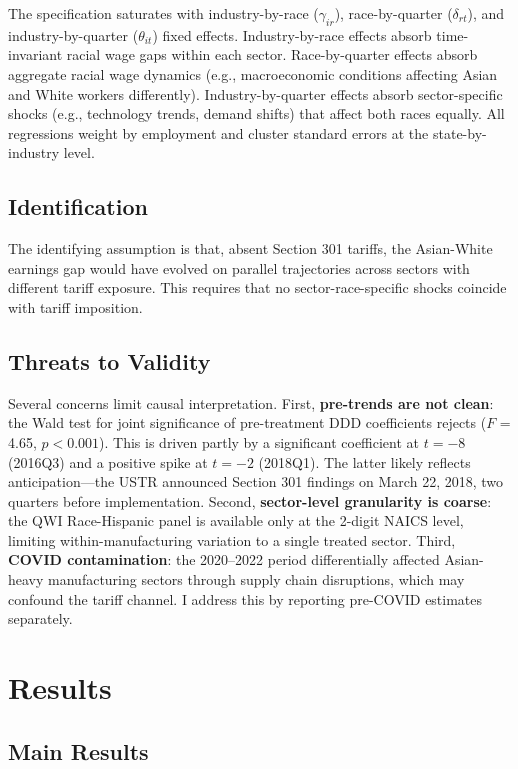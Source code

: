 \documentclass[12pt]{article}
\begin{document}
The specification saturates with industry-by-race ($\gamma_{ir}$), race-by-quarter ($\delta_{rt}$), and industry-by-quarter ($\theta_{it}$) fixed effects. Industry-by-race effects absorb time-invariant racial wage gaps within each sector. Race-by-quarter effects absorb aggregate racial wage dynamics (e.g., macroeconomic conditions affecting Asian and White workers differently). Industry-by-quarter effects absorb sector-specific shocks (e.g., technology trends, demand shifts) that affect both races equally. All regressions weight by employment and cluster standard errors at the state-by-industry level.

\subsection{Identification}

The identifying assumption is that, absent Section 301 tariffs, the Asian-White earnings gap would have evolved on parallel trajectories across sectors with different tariff exposure. This requires that no sector-race-specific shocks coincide with tariff imposition.

\subsection{Threats to Validity}

Several concerns limit causal interpretation. First, \textbf{pre-trends are not clean}: the Wald test for joint significance of pre-treatment DDD coefficients rejects ($F$ = 4.65, $p < 0.001$). This is driven partly by a significant coefficient at $t = -8$ (2016Q3) and a positive spike at $t = -2$ (2018Q1). The latter likely reflects anticipation---the USTR announced Section 301 findings on March 22, 2018, two quarters before implementation. Second, \textbf{sector-level granularity is coarse}: the QWI Race-Hispanic panel is available only at the 2-digit NAICS level, limiting within-manufacturing variation to a single treated sector. Third, \textbf{COVID contamination}: the 2020--2022 period differentially affected Asian-heavy manufacturing sectors through supply chain disruptions, which may confound the tariff channel. I address this by reporting pre-COVID estimates separately.

\section{Results}

\subsection{Main Results}
\end{document}
